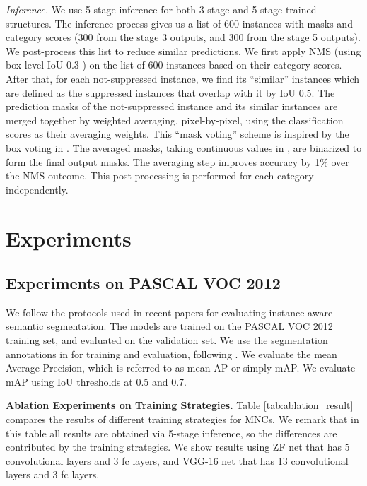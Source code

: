 \documentclass[10pt,twocolumn,letterpaper]{article}
\begin{document}
\vspace{.5em}
\noindent\emph{Inference.}
We use 5-stage inference for both 3-stage and 5-stage trained structures. The inference process gives us a list of 600 instances with masks and category scores (300 from the stage 3 outputs, and 300 from the stage 5 outputs).
We post-process this list to reduce similar predictions. We first apply NMS (using box-level IoU 0.3 \cite{Girshick2014}) on the list of 600 instances based on their category scores. After that, for each not-suppressed instance, we find its ``similar'' instances which are defined as the suppressed instances that overlap with it by IoU  0.5. The prediction masks of the not-suppressed instance and its similar instances are merged together by weighted averaging, pixel-by-pixel, using the classification scores as their averaging weights. This ``mask voting'' scheme is inspired by the box voting in \cite{Gidaris2015}.
The averaged masks, taking continuous values in , are binarized to form the final output masks. The averaging step improves accuracy by 1\% over the NMS outcome.
This post-processing is performed for each category independently.

\section{Experiments}

\subsection{Experiments on PASCAL VOC 2012}

We follow the protocols used in recent papers \cite{Hariharan2014,Dai2015,Hariharan2015} for evaluating instance-aware semantic segmentation. The models are trained on the PASCAL VOC 2012 training set, and evaluated on the validation set. We use the segmentation annotations in \cite{Hariharan2011} for training and evaluation, following \cite{Hariharan2014,Dai2015,Hariharan2015}.
We evaluate the mean Average Precision, which is referred to as mean AP \cite{Hariharan2014} or simply mAP. We evaluate mAP using IoU thresholds at 0.5 and 0.7.

\vspace{.5em}
\noindent\textbf{Ablation Experiments on Training Strategies.} Table \ref{tab:ablation_result} compares the results of different training strategies for MNCs. We remark that in this table all results are obtained via 5-stage inference, so the differences are contributed by the training strategies. We show results using ZF net \cite{Zeiler2014} that has 5 convolutional layers and 3 fc layers, and VGG-16 net \cite{Simonyan2015} that has 13 convolutional layers and 3 fc layers.
\end{document}
